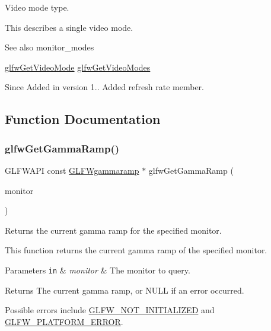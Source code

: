 Video mode type. 

This describes a single video mode.

\begin{DoxySeeAlso}{See also}
monitor\+\_\+modes 

\hyperlink{group__monitor_ga21f7f60de4f4d0fa360c7ad159b75c9e}{glfw\+Get\+Video\+Mode} \hyperlink{group__monitor_ga7eaea6132f15e9b5d47eb94f88547f79}{glfw\+Get\+Video\+Modes}
\end{DoxySeeAlso}
\begin{DoxySince}{Since}
Added in version 1..  Added refresh rate member. 
\end{DoxySince}


\subsection{Function Documentation}
\mbox{\label{group__monitor_gafe7b41852c1a14fe978f0e5381969885}} 
\subsubsection{\texorpdfstring{glfw\+Get\+Gamma\+Ramp()}{glfwGetGammaRamp()}}
{\footnotesize\ttfamily G\+L\+F\+W\+A\+PI const \hyperlink{structGLFWgammaramp}{G\+L\+F\+Wgammaramp} $\ast$ glfw\+Get\+Gamma\+Ramp (\begin{DoxyParamCaption}\item[{\hyperlink{group__monitor_ga8d9efd1cde9426692c73fe40437d0ae3}{G\+L\+F\+Wmonitor} $\ast$}]{monitor }\end{DoxyParamCaption})}



Returns the current gamma ramp for the specified monitor. 

This function returns the current gamma ramp of the specified monitor.


\begin{DoxyParams}[1]{Parameters}
\mbox{\tt in}  & {\em monitor} & The monitor to query. \\
\hline
\end{DoxyParams}
\begin{DoxyReturn}{Returns}
The current gamma ramp, or {\ttfamily N\+U\+LL} if an error occurred.
\end{DoxyReturn}
Possible errors include \hyperlink{group__errors_ga2374ee02c177f12e1fa76ff3ed15e14a}{G\+L\+F\+W\+\_\+\+N\+O\+T\+\_\+\+I\+N\+I\+T\+I\+A\+L\+I\+Z\+ED} and \hyperlink{group__errors_gad44162d78100ea5e87cdd38426b8c7a1}{G\+L\+F\+W\+\_\+\+P\+L\+A\+T\+F\+O\+R\+M\+\_\+\+E\+R\+R\+OR}.

